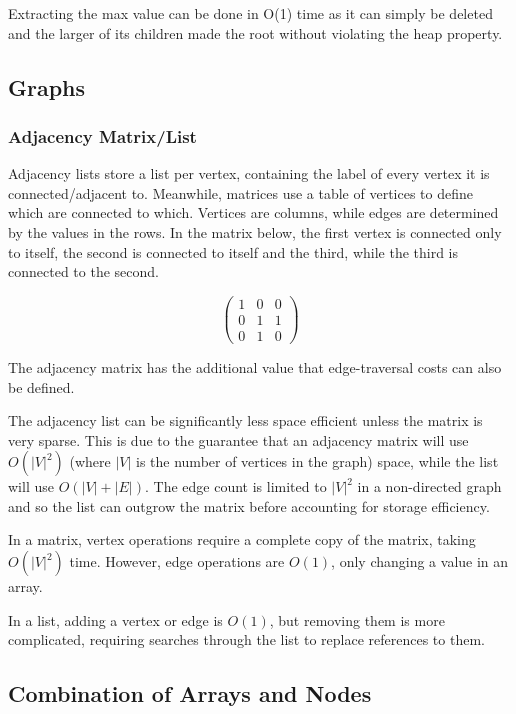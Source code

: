 \documentclass[]{article}
\begin{document}
Extracting the max value can be done in O(1) time as it can simply be deleted and the larger of its children made the root without violating the heap property.

\pagebreak

\subsection{Graphs}

\subsubsection{Adjacency Matrix/List}

Adjacency lists store a list per vertex, containing the label of every vertex it is connected/adjacent to. Meanwhile, matrices use a table of vertices to define which are connected to which. Vertices are columns, while edges are determined by the values in the rows. In the matrix below, the first vertex is connected only to itself, the second is connected to itself and the third, while the third is connected to the second.

\[ \left( \begin{array}{ccc}
1 & 0 & 0 \\
0 & 1 & 1 \\
0 & 1 & 0 \end{array} \right)\] 

The adjacency matrix has the additional value that edge-traversal costs can also be defined.

The adjacency list can be significantly less space efficient unless the matrix is very sparse. This is due to the guarantee that an adjacency matrix will use $O(|V|^{2})$ (where $|V|$ is the number of vertices in the graph) space, while the list will use $O(|V| + |E|)$. The edge count is limited to $|V|^{2}$ in a non-directed graph and so the list can outgrow the matrix before accounting for storage efficiency.

In a matrix, vertex operations require a complete copy of the matrix, taking $O(|V|^{2})$ time. However, edge operations are $O(1)$, only changing a value in an array.

In a list, adding a vertex or edge is $O(1)$, but removing them is more complicated, requiring searches through the list to replace references to them.

\pagebreak

\subsection{Combination of Arrays and Nodes}
\end{document}
